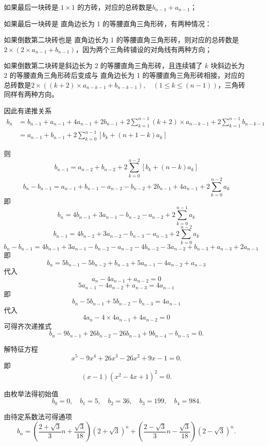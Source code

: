 \documentclass[12pt]{article}
\begin{document}
\begin{itemize}
    如果最后一块砖是 \( 1 \times 1 \) 的方砖，对应的总砖数是$b_{n-1} + a_{n-1}$；

    如果最后一块砖是 直角边长为 1 的等腰直角三角形砖，有两种情况：
    
    如果倒数第二块砖也是 直角边长为 1 的等腰直角三角形砖，则对应的总砖数是$2\times(2\times a_{n-1} + b_{n-1})$，因为两个三角砖铺设的对角线有两种方向；

    如果倒数第二块砖是斜边长为 2 的等腰直角三角形砖，且连续铺了 $k$ 块斜边长为 2 的等腰直角三角形砖后变成与 直角边长为 1 的等腰直角三角形砖相接，对应的总砖数是$2 \times((k+2)\times a_{n-k-1} + b_{n-k-1}), \quad (1 \leq k \leq (n-1))$，三角砖同样有两种方向。

    因此有递推关系
    \begin{align}
    b_n &= b_{n-1} + a_{n-1} + 4a_{n-1} + 2b_{n-1} + 2\sum_{k=1}^{n-1} (k+2)\times a_{n-k-1} + 2\sum_{k=1}^{n-1} b_{n-k-1} \\
    &= a_{n-1} + b_{n-1} + 2\sum_{k=0}^{n-1} [b_{k}+(n+1-k)a_{k}]
    \end{align}

    则\[b_{n-1} =  a_{n-2} + b_{n-2} + 2\sum_{k=0}^{n-2} [b_{k}+(n-k)a_{k}]\]
    \[b_n - b_{n-1} = a_{n-1} + b_{n-1} - a_{n-2} - b_{n-2} + 2b_{n-1} + 4a_{n-1}+2\sum_{k=0}^{n-2}a_{k}\]
    即\[b_n = 4b_{n-1} + 3a_{n-1} - b_{n-2} - a_{n-2} + 2\sum_{k=0}^{n-1}a_{k}\]
    \[b_{n-1} = 4b_{n-2} + 3a_{n-2} - b_{n-3} - a_{n-3} + 2\sum_{k=0}^{n-2}a_{k}\]
    \[b_n-b_{n-1} = 4b_{n-1} + 3a_{n-1} - b_{n-2} - a_{n-2} - 4b_{n-2} - 3a_{n-2} + b_{n-3} + a_{n-3} + 2a_{n-1}\]
    即\[b_n = 5b_{n-1}-5b_{n-2} + b_{n-3} + 5a_{n-1} -4a_{n-2} + a_{n-3}\]
    代入\[a_n-4a_{n-1}+a_{n-2}=0\]
    \[5a_{n-1} -4a_{n-2} + a_{n-3} = 4a_{n-1}\]
    即\[b_n - 5b_{n-1} + 5b_{n-2} - b_{n-3} = 4a_{n-1}\]
    代入\[4a_n-4\times 4a_{n-1}+4a_{n-2}=0\]
    可得齐次递推式
    \[
    b_n - 9b_{n-1} + 26b_{n-2} - 26b_{n-3} + 9b_{n-4} - b_{n-5} = 0.
    \]

    解特征方程
    \[
    x^5-9x^4+26x^3-26x^2+9x-1 = 0.
    \]
    即
    \[
    (x - 1)\left(x^2 - 4x + 1\right)^2 = 0.
    \]
    
    由枚举法得初始值
    \[
    b_0 = 0, \quad b_1 = 5, \quad b_2 = 36, \quad b_3 = 199, \quad b_4 = 984.
    \]
    
    由待定系数法可得通项
    \[
    b_n = \left(\frac{2 + \sqrt{3}}{3} n + \frac{\sqrt{3}}{18}\right)(2 + \sqrt{3})^n 
    + \left(\frac{2 - \sqrt{3}}{3} n - \frac{\sqrt{3}}{18}\right)(2 - \sqrt{3})^n.
    \]
\end{itemize}
\end{document}
